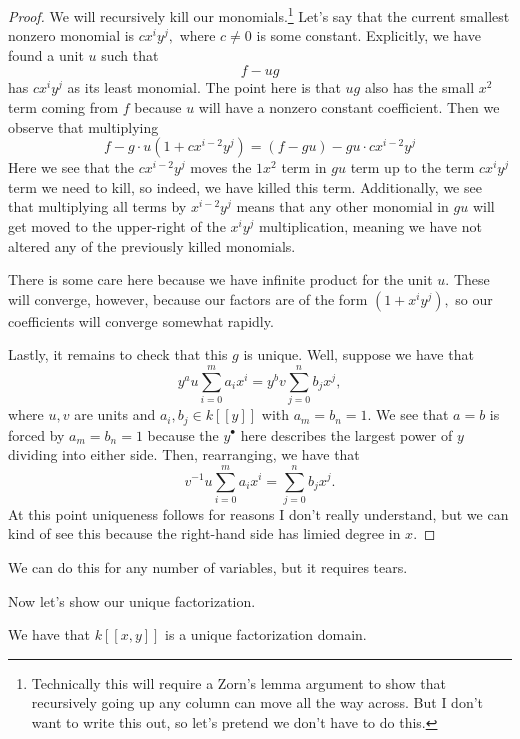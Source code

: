 \begin{proof}
	We will recursively kill our monomials.\footnote{Technically this will require a Zorn's lemma argument to show that recursively going up any column can move all the way across. But I don't want to write this out, so let's pretend we don't have to do this.} Let's say that the current smallest nonzero monomial is $cx^iy^j,$ where $c\ne0$ is some constant. Explicitly, we have found a unit $u$ such that
	\[f-ug\]
	has $cx^iy^j$ as its least monomial. The point here is that $ug$ also has the small $x^2$ term coming from $f$ because $u$ will have a nonzero constant coefficient. Then we observe that multiplying
	\[f-g\cdot u\left(1+cx^{i-2}y^j\right)=\left(f-gu\right)-gu\cdot cx^{i-2}y^j\]
	Here we see that the $cx^{i-2}y^j$ moves the $1x^2$ term in $gu$ term up to the term $cx^iy^j$ term we need to kill, so indeed, we have killed this term. Additionally, we see that multiplying all terms by $x^{i-2}y^j$ means that any other monomial in $gu$ will get moved to the upper-right of the $x^iy^j$ multiplication, meaning we have not altered any of the previously killed monomials.

	There is some care here because we have infinite product for the unit $u.$ These will converge, however, because our factors are of the form $\left(1+x^iy^j\right),$ so our coefficients will converge somewhat rapidly.

	Lastly, it remains to check that this $g$ is unique. Well, suppose we have that
	\[y^au\sum_{i=0}^ma_ix^i=y^bv\sum_{j=0}^nb_jx^j,\]
	where $u,v$ are units and $a_i,b_j\in k[[y]]$ with $a_m=b_n=1.$ We see that $a=b$ is forced by $a_m=b_n=1$ because the $y^\bullet$ here describes the largest power of $y$ dividing into either side. Then, rearranging, we have that
	\[v^{-1}u\sum_{i=0}^ma_ix^i=\sum_{j=0}^nb_jx^j.\]
	At this point uniqueness follows for reasons I don't really understand, but we can kind of see this because the right-hand side has limied degree in $x.$
\end{proof}
\begin{remark}
	We can do this for any number of variables, but it requires tears.
\end{remark}
Now let's show our unique factorization.
\begin{theorem}
	We have that $k[[x,y]]$ is a unique factorization domain.
\end{theorem}
